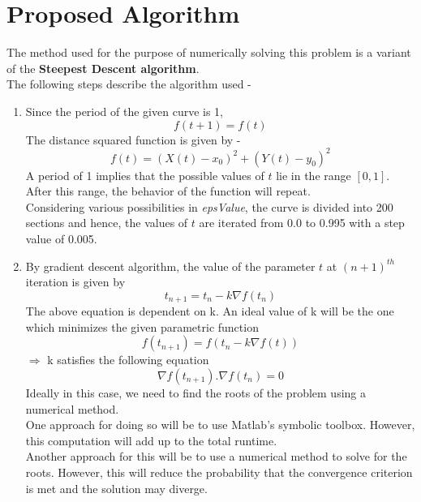 \documentclass[12pt]{article}
\begin{document}
\section*{Proposed Algorithm}
The method used for the purpose of numerically solving this problem is a variant of the \textbf{Steepest Descent algorithm}. \\
The following steps describe the algorithm used -
\begin{enumerate}
    \item Since the period of the given curve is 1, 
    \begin{equation}
        f(t+1) = f(t)
    \end{equation}
    The distance squared function is given by -
    \begin{equation}
        f(t) = (X(t) - x_0)^2 + (Y(t) - y_0)^2
    \end{equation}
    A period of 1 implies that the possible values of $t$ lie in the range $[0,1]$. After this range, the behavior of the function will repeat. \\
	Considering various possibilities in \textit{epsValue}, the curve is divided into 200 sections and hence, the values of $t$ are iterated from 0.0 to 0.995 with a step value of 0.005.
    
    \item
    By gradient descent algorithm, the value of the parameter $t$ at $(n+1)^{th}$ iteration is given by
    \begin{equation}
        t_{n+1} = t_n - k\nabla f(t_n)
    \end{equation}
    The above equation is dependent on k. An ideal value of k will be the one which minimizes the given parametric function
    \begin{equation}
        f(t_{n+1}) = f(t_n - k\nabla f(t))
    \end{equation}
    $\Rightarrow$ k satisfies the following equation
    \begin{equation}
        \nabla f(t_{n+1}) . \nabla f(t_n) = 0
    \end{equation} 
    Ideally in this case, we need to find the roots of the problem using a numerical method. \\
    One approach for doing so will be to use Matlab's symbolic toolbox. However, this computation will add up to the total runtime. \\
    Another approach for this will be to use a numerical method to solve for the roots. However, this will reduce the probability that the convergence criterion is met and the solution may diverge.
    

\end{enumerate}
\end{document}
